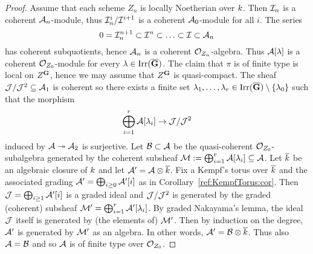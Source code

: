 \begin{proof}
Assume that each scheme $Z_n$ is locally Noetherian over $k$. Then ${\mathcal I}_n$
is a coherent ${\mathcal A}_n$-module, thus ${\mathcal I}_n^i/{\mathcal I}^{i+1}$ is a coherent
${\mathcal A}_0$-module for all $i$. The series
\[
    0 = {\mathcal I}_n^{n+1} \subset {\mathcal I}^n \subset  \ldots \subset {\mathcal I} \subset {\mathcal A}_n
\]
has coherent subquotients, hence ${\mathcal A}_n$ is a coherent ${\mathcal O}_{Z_n}$-algebra.
Thus ${\mathcal A}[\lambda]$ is a coherent ${\mathcal O}_{Z_0}$-module for every
$\lambda\in \operatorname{Irr}(\overline{\mathbf{G}})$. The claim that $\pi$ is of finite type is local on
$Z^{\mathbf{G}}$, hence we may
assume that $Z^{\mathbf{G}}$ is quasi-compact.
The sheaf ${\mathcal J}/{\mathcal J}^2\subseteq {\mathcal A}_1$ is coherent so there exists a finite set
$\lambda_1, \ldots, \lambda_r\in \operatorname{Irr}(\overline{\mathbf{G}})\setminus \{\lambda_0\}$ such that the morphism
\[
    \bigoplus_{i=1}^r{\mathcal A}[\lambda_i]\rightarrow {\mathcal J}/{\mathcal J}^2
\]
induced by ${\mathcal A}\twoheadrightarrow {\mathcal A}_2$ is surjective. Let ${\mathcal B} \subset {\mathcal A}$
be the quasi-coherent ${\mathcal O}_{Z_0}$-subalgebra generated by the coherent
subsheaf ${\mathcal M} := \bigoplus_{i=1}^r{\mathcal A}[\lambda_i]\subseteq {\mathcal A}$.
Let $\overline{k}$ be an algebraic closure of $k$ and let ${\mathcal A}' = {\mathcal A} \otimes
\overline{k}$. Fix a Kempf's torus over
$\overline{k}$ and the associated grading ${\mathcal A}' = \bigoplus_{i\geq 0}
{\mathcal A}'[i]$ as in
Corollary~\ref{ref:KempfTorus:cor}.
Then ${\mathcal J} = \bigoplus_{i\geq 1} {\mathcal A}'[i]$ is a graded ideal and ${\mathcal J}/{\mathcal J}^2$ is
generated by the graded (coherent) subsheaf ${\mathcal M}' = \bigoplus_{i=1}^r{\mathcal A}'[\lambda_i]$. By
graded Nakayama's lemma, the ideal ${\mathcal J}$ itself is generated by (the elements
of) ${\mathcal M}'$. Then by induction on the degree, ${\mathcal A}'$ is generated by ${\mathcal M}'$ as
an algebra. In other words, ${\mathcal A}' = {\mathcal B}\otimes \overline{k}$. Thus also ${\mathcal A} = {\mathcal B}$ and so ${\mathcal A}$ is of
finite type over ${\mathcal O}_{Z_0}$.
\end{proof}













\small




